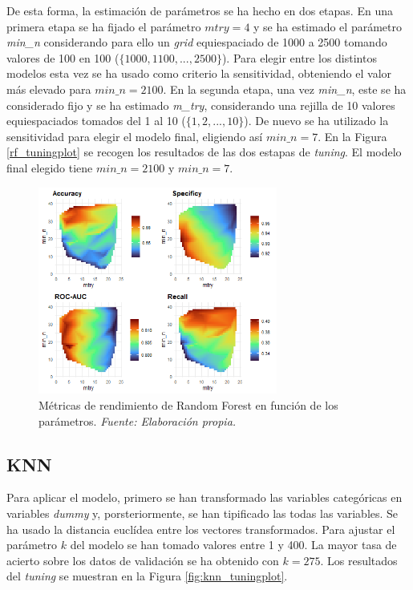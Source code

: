 \documentclass[12pt,a4paper,]{book}
\newcounter{dummy}
\numberwithin{dummy}{section}
\theoremstyle{ocrenumbox}
\theoremstyle{blacknumex}
\theoremstyle{blacknumbox}
\theoremstyle{ocrenum}
\theoremstyle{ocrenum}
\begin{document}
De esta forma, la estimación de parámetros se ha hecho en dos etapas. En
una primera etapa se ha fijado el parámetro \(mtry = 4\) y se ha
estimado el parámetro \emph{min\_n} considerando para ello un
\emph{grid} equiespaciado de 1000 a 2500 tomando valores de 100 en 100
(\(\{1000,1100,...,2500\}\)). Para elegir entre los distintos modelos
esta vez se ha usado como criterio la sensitividad, obteniendo el valor
más elevado para \(min\_n = 2100\). En la segunda etapa, una vez
\emph{min\_n}, este se ha considerado fijo y se ha estimado
\emph{m\_try}, considerando una rejilla de 10 valores equiespaciados
tomados del 1 al 10 (\(\{1,2,...,10\}\)). De nuevo se ha utilizado la
sensitividad para elegir el modelo final, eligiendo así \(min\_n = 7\).
En la Figura \ref{rf_tuningplot} se recogen los resultados de las dos
estapas de \emph{tuning}. El modelo final elegido tiene
\(min\_n = 2100\) y \(min\_n = 7\).

\begin{figure}[h!]
\centering
\includegraphics[width =0.7\textwidth]{graficos/rf_tuningplot.png}
\caption{Métricas de rendimiento de Random Forest en función de los parámetros.  \it Fuente: Elaboración propia.}
\label{fig:rf_tuningplot}
\end{figure}

\hypertarget{knn}{%
\subsection{KNN}\label{knn}}

Para aplicar el modelo, primero se han transformado las variables
categóricas en variables \emph{dummy} y, porsteriormente, se han
tipificado las todas las variables. Se ha usado la distancia euclídea
entre los vectores transformados. Para ajustar el parámetro \(k\) del
modelo se han tomado valores entre 1 y 400. La mayor tasa de acierto
sobre los datos de validación se ha obtenido con \(k = 275\). Los
resultados del \emph{tuning} se muestran en la Figura
\ref{fig:knn_tuningplot}.
\end{document}
